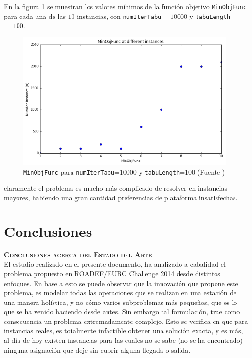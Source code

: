 \documentclass[letter, 10pt]{article}
\begin{document}
\begin{description}
    En la figura \ref{fig:minobj} se muestran los valores mínimos de la función objetivo \texttt{MinObjFunc} para cada una de las $10$ instancias, con \texttt{numIterTabu}$=10000$ y \texttt{tabuLength}$=100$.
    \begin{figure}[htpb!]
    \centering
    \includegraphics[width=11cm]{minobjfunc}
    \caption{\texttt{MinObjFunc} para \texttt{numIterTabu}=10000 y \texttt{tabuLength}=100 (Fuente \cite{Higgins})}
    \label{fig:minobj}
    \end{figure}
    claramente el problema es mucho más complicado de resolver en instancias mayores, habiendo una gran cantidad preferencias de plataforma insatisfechas.
\end{description}




\newpage
\section{Conclusiones} \label{conclusions}

\large{\textbf{{\textsc{Conclusiones acerca del Estado del Arte}}}}\\

El estudio realizado en el presente documento, ha analizado a cabalidad el problema propuesto en ROADEF/EURO Challenge 2014 desde distintos enfoques. En base a esto se puede observar que la innovación que propone este problema, es modelar todas las operaciones que se realizan en una estación de una manera holística, y no cómo varios subproblemas más pequeños, que es lo que se ha venido haciendo desde antes. Sin embargo tal formulación, trae como consecuencia un problema extremadamente complejo. Esto se verifica en que para instancias reales, es totalmente infactible obtener una solución exacta, y es más, al día de hoy existen instancias para las cuales no se sabe (no se ha encontrado) ninguna asignación que deje sin cubrir alguna llegada o salida.
\end{document}
